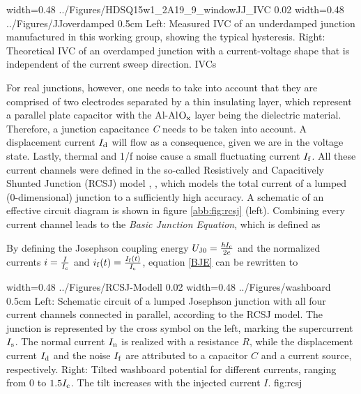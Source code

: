 {width=0.48\textwidth}
{../Figures/HDSQ15w1_2A19_9_windowJJ_IVC}
{0.02\textwidth} %
{width=0.48\textwidth}
{../Figures/JJoverdamped}
{0.5cm} %
{Left: Measured IVC of an underdamped junction manufactured in this working group, showing the typical hysteresis. Right: Theoretical IVC of an overdamped junction with a current-voltage shape that is independent of the current sweep direction.}
{IVCs}

For real junctions, however, one needs to take into account that they are comprised of two electrodes separated by a thin insulating layer, which represent a parallel plate capacitor with the Al-Al$\rm O_x$ layer being the dielectric material. Therefore, a junction capacitance \textit{C} needs to be taken into account. A displacement current $I_{\rm d}$ will flow as a consequence, given we are in the voltage state. Lastly, thermal and 1/f noise cause a small fluctuating current $I_{\rm f}$. All these current channels were defined in the so-called Resistively and Capacitively Shunted Junction (RCSJ) model \cite{Cumber1968}, \cite{Stewart1968}, which models the total current of a lumped (0-dimensional) junction to a sufficiently high accuracy. A schematic of an effective circuit diagram is shown in figure \ref{abb:fig:rcsj} (left). Combining every current channel leads to the \textit{Basic Junction Equation}, which is defined as \cite{Gross2016}


By defining the Josephson coupling energy $U_{\rm J0}=\frac{\hbar I_{\rm c}}{2e}$ and the normalized currents $i=\frac{I}{I_{\rm c}}$ and $i_{\rm f}(t)=\frac{I_{\rm f}(t)}{I_{\rm c}}$, equation \ref{BJE} can be rewritten to 


{width=0.48\textwidth}
{../Figures/RCSJ-Modell}
{0.02\textwidth} %
{width=0.48\textwidth}
{../Figures/washboard}
{0.5cm} %
{Left: Schematic circuit of a lumped Josephson junction with all four current channels connected in parallel, according to the RCSJ model. The junction is represented by the cross symbol on the left, marking the supercurrent $I_{\rm s}$. The normal current $I_{\rm n}$ is realized with a resistance $R$, while the displacement current $I_{\rm d}$ and the noise $I_{\rm f}$ are attributed to a capacitor $C$ and a current source, respectively. Right: Tilted washboard potential for different currents, ranging from 0 to $1.5I_{\rm c}$. The tilt increases with the injected current $I$.}
{fig:rcsj}

